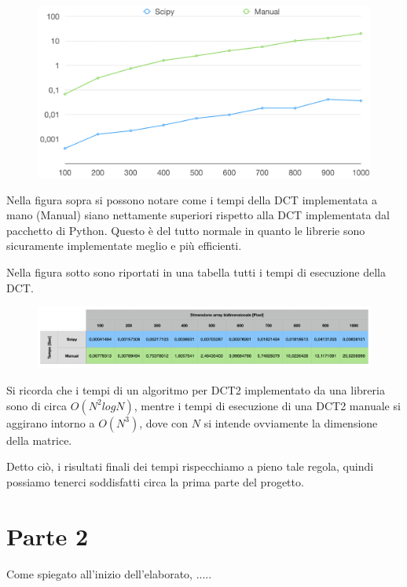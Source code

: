 \documentclass[preprint,12pt]{elsarticle}
\begin{document}
\begin{figure}[H]
	\centering
	\includegraphics[width=\linewidth]{grafico}
\end{figure}

Nella figura sopra si possono notare come i tempi della DCT implementata a mano (Manual) siano nettamente superiori rispetto alla DCT implementata dal pacchetto di Python. Questo è del tutto normale in quanto le librerie sono sicuramente implementate meglio e più efficienti.

\newpage
Nella figura sotto sono riportati in una tabella tutti i tempi di esecuzione della DCT.

\begin{figure}[H]
	\centering
	\includegraphics[width=\linewidth]{tabella}
\end{figure}

Si ricorda che i tempi di un algoritmo per DCT2 implementato da una libreria sono di circa $O(N^2 logN)$, mentre i tempi di esecuzione di una DCT2 manuale si aggirano intorno a $O(N^3)$, dove con $N$ si intende ovviamente la dimensione della matrice.

Detto ciò, i risultati finali dei tempi rispecchiamo a pieno tale regola, quindi possiamo tenerci soddisfatti circa la prima parte del progetto. 

\newpage

\section{Parte 2}
Come spiegato all'inizio dell'elaborato, .....
\end{document}

